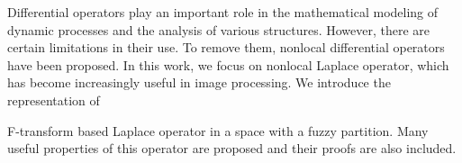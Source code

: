 
Differential operators play an important role in the mathematical modeling of dynamic processes and the analysis of various structures. However, there are certain limitations in their use. To remove them, nonlocal differential operators have been proposed. In this work, we focus on nonlocal Laplace operator, which has become increasingly useful in image processing. We introduce the representation of 

F-transform based Laplace operator in a space with a fuzzy partition. Many useful properties of this operator are proposed and their proofs are also included.



